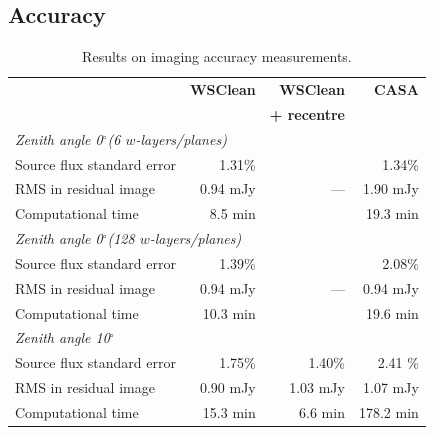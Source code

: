\documentclass[useAMS,usenatbib]{mn2e}
\newcommand{\degree}{\ensuremath{^{\circ}}\xspace}
\begin{document}
\subsection{Accuracy}
\begin{table}%
\caption{Results on imaging accuracy measurements.} \label{tbl:accuracy-measurements}%
\begin{center}\begin{tabular}{lrrr}%
\hline\hline
& \textbf{WSClean} & \textbf{WSClean}    & \textbf{CASA} \\
&                  & \textbf{+ recentre} & \\
\hline
\multicolumn{3}{l}{\textit{Zenith angle 0\degree (6 $w$-layers/planes)}} \\
\hline
Source flux standard error & 1.31\% & & 1.34\% \\
RMS in residual image & 0.94 mJy & --- & 1.90 mJy\\
Computational time & 8.5 min & & 19.3 min\\
\hline
\multicolumn{3}{l}{\textit{Zenith angle 0\degree (128 $w$-layers/planes)}} \\
\hline
Source flux standard error & 1.39\% & & 2.08\% \\
RMS in residual image & 0.94 mJy & --- & 0.94 mJy \\
Computational time & 10.3 min & & 19.6 min \\
\hline
\multicolumn{3}{l}{\textit{Zenith angle 10\degree}} \\
\hline
Source flux standard error & 1.75\% & 1.40\% & 2.41 \%\\
RMS in residual image & 0.90 mJy & 1.03 mJy & 1.07 mJy \\
Computational time & 15.3 min & 6.6 min & 178.2 min \\
\hline\hline
\end{tabular}\end{center}\end{table}
\end{document}
